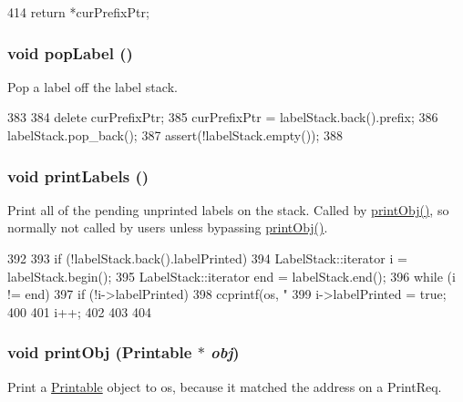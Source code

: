 \begin{DoxyCode}
414 { return *curPrefixPtr; }
\end{DoxyCode}
\hypertarget{classPacket_1_1PrintReqState_a3ab6da7065be0d85f45a8dd050515f16}{
\subsubsection[{popLabel}]{\setlength{\rightskip}{0pt plus 5cm}void popLabel ()}}
\label{classPacket_1_1PrintReqState_a3ab6da7065be0d85f45a8dd050515f16}
Pop a label off the label stack. 


\begin{DoxyCode}
383 {
384     delete curPrefixPtr;
385     curPrefixPtr = labelStack.back().prefix;
386     labelStack.pop_back();
387     assert(!labelStack.empty());
388 }
\end{DoxyCode}
\hypertarget{classPacket_1_1PrintReqState_afbf1f814881d73eefde6bccdde641db8}{
\subsubsection[{printLabels}]{\setlength{\rightskip}{0pt plus 5cm}void printLabels ()}}
\label{classPacket_1_1PrintReqState_afbf1f814881d73eefde6bccdde641db8}
Print all of the pending unprinted labels on the stack. Called by \hyperlink{classPacket_1_1PrintReqState_a943819fd659ba72526301cffe5479ed9}{printObj()}, so normally not called by users unless bypassing \hyperlink{classPacket_1_1PrintReqState_a943819fd659ba72526301cffe5479ed9}{printObj()}. 


\begin{DoxyCode}
392 {
393     if (!labelStack.back().labelPrinted) {
394         LabelStack::iterator i = labelStack.begin();
395         LabelStack::iterator end = labelStack.end();
396         while (i != end) {
397             if (!i->labelPrinted) {
398                 ccprintf(os, "%
399                 i->labelPrinted = true;
400             }
401             i++;
402         }
403     }
404 }
\end{DoxyCode}
\hypertarget{classPacket_1_1PrintReqState_a943819fd659ba72526301cffe5479ed9}{
\subsubsection[{printObj}]{\setlength{\rightskip}{0pt plus 5cm}void printObj ({\bf Printable} $\ast$ {\em obj})}}
\label{classPacket_1_1PrintReqState_a943819fd659ba72526301cffe5479ed9}
Print a \hyperlink{classPrintable}{Printable} object to os, because it matched the address on a PrintReq. 


